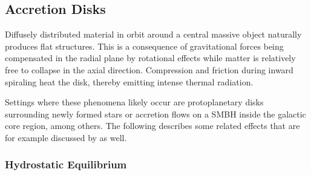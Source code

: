 \subsection{Accretion Disks}
\label{sub:accretion}

Diffusely distributed material in orbit around a central massive object naturally produces flat structures. This is a
consequence of gravitational forces being compensated in the radial plane by rotational effects while matter is relatively
free to collapse in the axial direction. Compression and friction during inward spiraling heat the disk, thereby emitting
intense thermal radiation.

Settings where these phenomena likely occur are protoplanetary disks surrounding newly formed
stars or accretion flows on a SMBH inside the galactic core region, among others. The following describes some
related effects that are for example discussed by \cite{Longair_2011} as well.



\subsubsection*{Hydrostatic Equilibrium}

